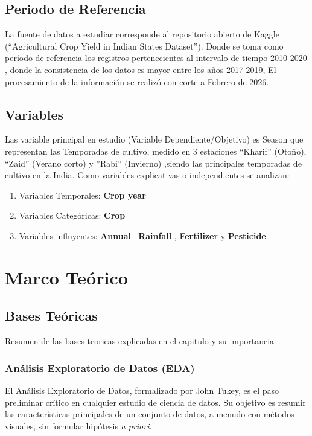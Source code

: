 \documentclass[oneside,11pt]{Latex/Classes/PhDthesisPSnPDF}
\begin{document}
\section{Periodo de Referencia}

La fuente de datos a estudiar corresponde al repositorio abierto de
Kaggle (``Agricultural Crop Yield in Indian States Dataset''). Donde se
toma como período de referencia los registros pertenecientes al
intervalo de tiempo 2010-2020 , donde la consistencia de los datos es
mayor entre los años 2017-2019, El procesamiento de la información se
realizó con corte a Febrero de 2026.

\section{Variables}

Las variable principal en estudio (Variable Dependiente/Objetivo) es
Season que representan las Temporadas de cultivo, medido en 3 estaciones
``Kharif'' (Otoño), ``Zaid'' (Verano corto) y ''Rabi'' (Invierno)
,siendo las principales temporadas de cultivo en la India. Como
variables explicativas o independientes se analizan:

\begin{enumerate}
  \item Variables Temporales: \textbf{Crop year}
  \item Variables Categóricas: \textbf{Crop} 
  \item Variables influyentes: \textbf{Annual\_Rainfall }, \textbf{Fertilizer } y \textbf{Pesticide }
\end{enumerate}

\chapter{Marco Teórico}

\section{Bases Teóricas}

Resumen de las bases teoricas explicadas en el capitulo y su
importancia\\

\subsection{Análisis Exploratorio de Datos (EDA)}

El Análisis Exploratorio de Datos, formalizado por John Tukey, es el
paso preliminar crítico en cualquier estudio de ciencia de datos. Su
objetivo es resumir las características principales de un conjunto de
datos, a menudo con métodos visuales, sin formular hipótesis \emph{a
priori}.
\end{document}
